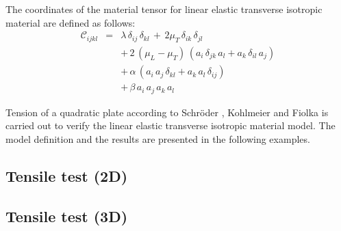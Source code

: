 The coordinates of the material tensor for linear elastic transverse isotropic material are defined as follows:
\begin{eqnarray}
\mathcal{C}_{ijkl} & = & \lambda\,\delta_{ij}\,\delta_{kl}\,+\,
                        2\mu_T\,\delta_{ik}\,\delta_{jl} \nonumber \\[1.50ex]
                   &   & +\,2\,\left(\mu_L-\mu_T\right)\,
                         \left(a_i\,\delta_{jk}\,a_l+a_k\,\delta_{il}\,a_j\right) \nonumber \\[1.50ex]
                   &   & +\,\alpha\,\left(a_i\,a_j\,\delta_{kl}+a_k\,a_l\,\delta_{ij}\right) \nonumber \\[1.50ex]
                   &   & +\,\beta\,a_i\,a_j\,a_k\,a_l
\end{eqnarray}

Tension of a quadratic plate according to Schr\"oder \cite{Schroeder:1996}, Kohlmeier \cite{Kohlmeier:2006} and Fiolka \cite{Fiolka:2007} is carried out to verify the linear elastic transverse isotropic material model. The model definition and the results are presented in the following examples.

\clearpage

\subsection{Tensile test (2D)}
\label{subsec:transiso_tens2d}


\clearpage

\subsection{Tensile test (3D)}
\label{subsec:transiso_tens3d}

